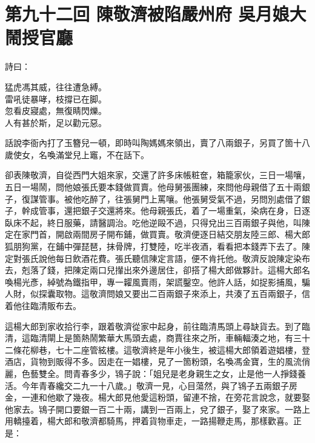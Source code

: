 
\chapter*{第九十二回 陳敬濟被陷嚴州府 吳月娘大鬧授官廳}


詩曰：

\begin{myquote}
猛虎馮其威，往往遭急縛。\\雷吼徒暴哮，枝撐已在脚。\\忽看皮寢處，無復睛閃爍。\\人有甚於斯，足以勸元惡。
\end{myquote}

話說李衙內打了玉簪兒一頓，即時叫陶媽媽來領出，賣了八兩銀子，另買了箇十八歲使女，名喚滿堂兒上竈，不在話下。

卻表陳敬濟，自從西門大姐來家，交還了許多床帳粧奩，箱籠家伙，三日一場嚷，五日一場鬧，問他娘張氏要本錢做買賣。他母舅張團練，來問他母親借了五十兩銀子，復謀管事。被他吃醉了，往張舅門上罵嚷。{}他張舅受氣不過，另問別處借了銀子，幹成管事，還把銀子交還將來。他母親張氏，着了一場重氣，染病在身，日逐臥床不起，終日服藥，請醫調治。吃他逆毆不過，只得兌出三百兩銀子與他，叫陳定在家門首，開啟兩間房子開布鋪，做買賣。敬濟便逐日結交朋友陸三郎、楊大郎狐朋狗黨，在鋪中彈琵琶，抹骨牌，打雙陸，吃半夜酒，看看把本錢弄下去了。陳定對張氏說他每日飲酒花費。張氏聽信陳定言語，便不肯托他。敬濟反說陳定染布去，剋落了錢，把陳定兩口兒攆出來外邊居住，卻搭了楊大郎做夥計。這楊大郎名喚楊光彥，綽號為鐵指甲，專一糶風賣雨，{}架謊鑿空。他許人話，如捉影捕風，騙人財，似探囊取物。這敬濟問娘又要出二百兩銀子來添上，共湊了五百兩銀子，信着他往臨清販布去。

這楊大郎到家收拾行李，跟着敬濟從家中起身，前往臨清馬頭上尋缺貨去。到了臨清，這臨清閘上是箇熱鬧繁華大馬頭去處，商賈往來之所，車輛輻湊之地，有三十二條花柳巷，七十二座管絃樓。這敬濟終是年小後生，被這楊大郎領着遊娼樓，登酒店，貨物到販得不多。因走在一娼樓，見了一箇粉頭，名喚馮金寶，生的風流俏麗，色藝雙全。問青春多少，鴇子說：「姐兒是老身親生之女，止是他一人掙錢養活。今年青春纔交二九一十八歲。」敬濟一見，心目蕩然，與了鴇子五兩銀子房金，一連和他歇了幾夜。楊大郎見他愛這粉頭，留連不捨，在旁花言說念，就要娶他家去。鴇子開口要銀一百二十兩，講到一百兩上，兌了銀子，娶了來家。一路上用轎擡着，楊大郎和敬濟都騎馬，押着貨物車走，一路揚鞭走馬，那樣歡喜。正是：

